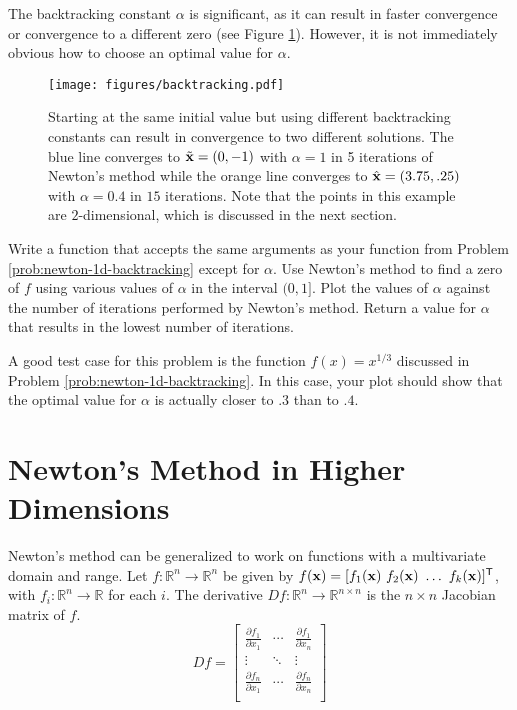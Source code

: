 The backtracking constant $\alpha$ is significant, as it can result in faster convergence or convergence to a different zero (see Figure \ref{fig:newton-backtracking-multi-result}).
However, it is not immediately obvious how to choose an optimal value for $\alpha$.

\begin{figure}[H]
\centering
\texttt{[image: figures/backtracking.pdf]}
\caption{Starting at the same initial value but using different backtracking constants can result in convergence to two different solutions.
The blue line converges to $\tilde{\mathbf{x}} = (0,-1)$ with $\alpha = 1$ in 5 iterations of Newton's method while the orange line converges to $\hat{\mathbf{x}} = (3.75,.25)$ with $\alpha = 0.4$ in $15$ iterations.
Note that the points in this example are $2$-dimensional, which is discussed in the next section.}
\label{fig:newton-backtracking-multi-result}
\end{figure}

\begin{problem} %
\label{prob:newton-backtracking-search}
Write a function that accepts the same arguments as your function from Problem \ref{prob:newton-1d-backtracking} except for $\alpha$.
Use Newton's method to find a zero of $f$ using various values of $\alpha$ in the interval $(0,1]$.
Plot the values of $\alpha$ against the number of iterations performed by Newton's method.
Return a value for $\alpha$ that results in the lowest number of iterations.

A good test case for this problem is the function $f(x) = x^{1/3}$ discussed in Problem \ref{prob:newton-1d-backtracking}.
In this case, your plot should show that the optimal value for $\alpha$ is actually closer to $.3$ than to $.4$.
\end{problem}

\section*{Newton's Method in Higher Dimensions} %

Newton's method can be generalized to work on functions with a multivariate domain and range.
Let $f:\mathbb{R}^n\rightarrow\mathbb{R}^n$ be given by $f(\x)=[f_1(\x)\ f_2(\x)\ \ldots\ f_k(\x)]\trp$, with $f_i:\mathbb{R}^n\to\mathbb{R}$ for each $i$.
The derivative $Df:\mathbb{R}^n\rightarrow\mathbb{R}^{n\times n}$ is the $n\times n$ Jacobian matrix of $f$.
\[
Df =
\left[\begin{array}{ccc}
\frac{\partial f_1}{\partial x_1} & \cdots & \frac{\partial f_1}{\partial x_n} \\
\vdots & \ddots & \vdots \\
\frac{\partial f_n}{\partial x_1} & \cdots & \frac{\partial f_n}{\partial x_n} \\
\end{array}\right]
\]

